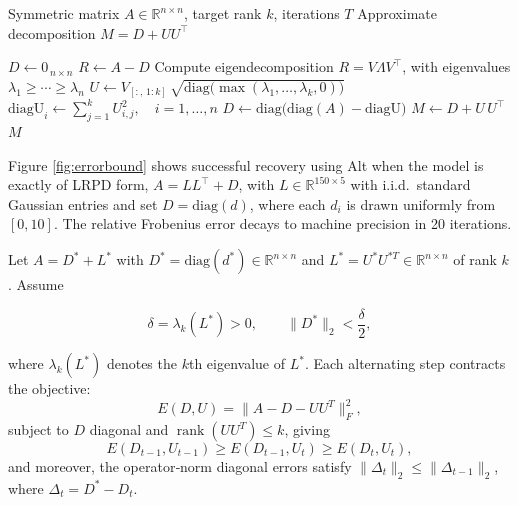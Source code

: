 \documentclass[final,hidelinks,onefignum,onetabnum]{siamart250211}
\providecommand{\R}{\mathbb{R}}
\providecommand{\diag}{\mathrm{diag}}
\providecommand{\1}{\mathbf{1}}
\theoremstyle{plain}
\DeclareMathOperator{\rank}{rank}
\begin{document}
\begin{algorithm}
\caption{Alternating Low‐Rank then Diagonal (Alt)}
\label{alg:alt_lr_diag_error}
\begin{algorithmic}[1]
\REQUIRE Symmetric matrix $A\in\mathbb{R}^{n\times n}$, target rank $k$, iterations $T$
\ENSURE Approximate decomposition $M = D + U U^\top$

\STATE $D \gets 0_{\,n\times n}$  
  \STATE $R \gets A - D$  
  \STATE Compute eigendecomposition $R = V \Lambda V^\top$, with eigenvalues $\lambda_1 \ge \cdots \ge \lambda_n$
  \STATE $U \gets V_{[:,\,1:k]}\,\sqrt{\diag\bigl(\max(\lambda_1,\dots,\lambda_k,0)\bigr)}$
  \STATE $\text{diagU}_i \gets \sum_{j=1}^k U_{i,j}^2,\quad i=1,\dots,n$  
  \STATE $D \gets \diag\!\bigl(\diag(A) - \text{diagU}\bigr)$  
\ENDFOR
\STATE $M \gets D + U\,U^\top$
\RETURN $M$
\end{algorithmic}
\end{algorithm}


Figure \ref{fig:errorbound} shows successful recovery using Alt when the model is exactly of LRPD form, $A = LL^\top + D$, with \(L \in \mathbb{R}^{150 \times 5}\) with i.i.d.~standard Gaussian entries and set \(D = \mathrm{diag}(d)\), where each \(d_i\) is drawn uniformly from \([0,10]\). The relative Frobenius error decays to machine precision in 20 iterations.


\begin{theorem}
\label{thm:suffcontraction}
Let \(A = D^* + L^*\) with \(D^*=\diag(d^*)\in\R^{n\times n}\) and \(L^*=U^*U^{*T}\in\R^{n\times n}\) of rank \(k\). 
Assume 

\begin{equation} \label{eq:gap_condition}
    \delta=\lambda_k(L^*)>0,
    \qquad
    \|D^*\|_2<\frac{\delta}{2},
\end{equation}

where \(\lambda_k(L^*)\) denotes the \(k\)th eigenvalue of \(L^*\). 
Each alternating step contracts the objective:
\[
E(D,U)
=\bigl\|A - D - UU^T\bigr\|_F^2,
\]
subject to \(D\) diagonal and \(\rank(UU^T)\le k\), giving
\[
E(D_{t-1},U_{t-1})
\ge
E(D_{t-1},U_t)
\ge
E(D_t,U_t),
\]
and moreover, the operator‐norm diagonal errors satisfy
\(\|\Delta_t\|_2\le \|\Delta_{t-1}\|_2\), where \(\Delta_t=D^*-D_t\).
\end{theorem}
\end{document}
